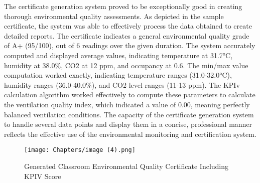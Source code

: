 The certificate generation system proved to be exceptionally good in creating thorough environmental quality assessments. As depicted in the sample certificate, the system was able to effectively process the data obtained to create detailed reports. The certificate indicates a general environmental quality grade of A+ (95/100), out of 6 readings over the given duration. The system accurately computed and displayed average values, indicating temperature at 31.7°C, humidity at 38.0\%, CO2 at 12 ppm, and occupancy at 0.6. The min/max value computation worked exactly, indicating temperature ranges (31.0-32.0°C), humidity ranges (36.0-40.0\%), and CO2 level ranges (11-13 ppm). The KPIv calculation algorithm worked effectively to compute these parameters to calculate the ventilation quality index, which indicated a value of 0.00, meaning perfectly balanced ventilation conditions. The capacity of the certificate generation system to handle several data points and display them in a concise, professional manner reflects the effective use of the environmental monitoring and certification system.
\begin{figure}[h!]
		\centering
	\texttt{[image: Chapters/image (4).png]}
		\caption{Generated Classroom Environmental Quality Certificate Including KPIV Score}
\end{figure}


